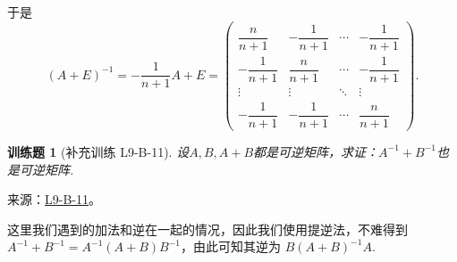 \documentclass[12pt,fontset=fandol]{ctexart}
\newtheorem{exercise}{训练题}[section]
\begin{document}
\begin{solve}
\begin{enumerate}
                    于是
                    \[
                        (A+E)^{-1} = -\frac{1}{n+1} A + E = \begin{pmatrix}
                            \dfrac{n}{n+1}  & -\dfrac{1}{n+1} & \cdots & -\dfrac{1}{n+1} \\[2em]
                            -\dfrac{1}{n+1} & \dfrac{n}{n+1}  & \cdots & -\dfrac{1}{n+1} \\[2em]
                            \vdots          & \vdots          & \ddots & \vdots          \\[2em]
                            -\dfrac{1}{n+1} & -\dfrac{1}{n+1} & \cdots & \dfrac{n}{n+1}
                        \end{pmatrix}.
                    \]
            \end{enumerate}
\end{solve}

\begin{exercise}[补充训练 L9-B-11]\label{prob:L9-B-11}
设$A,B,A+B$都是可逆矩阵，求证：$A^{-1}+B^{-1}$也是可逆矩阵.
\end{exercise}
\noindent 来源：\href{https://github.com/yhwu-is/Linear-Algebra-Left-Undone/blob/new/%E8%AE%B2%E4%B9%89/%E4%B8%93%E9%A2%98/9%20%E7%9F%A9%E9%98%B5%E8%BF%90%E7%AE%97%E8%BF%9B%E9%98%B6.tex}{L9-B-11}。
\begin{solve}
这里我们遇到的加法和逆在一起的情况，因此我们使用提逆法，不难得到 $A^{-1}+B^{-1}=A^{-1}(A+B)B^{-1}$，由此可知其逆为 $B(A+B)^{-1}A$.
\end{solve}
\end{document}
